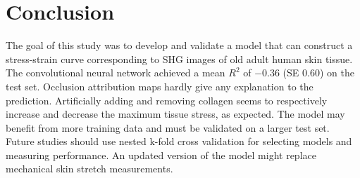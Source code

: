 \section{Conclusion}
The goal of this study was to develop and validate a model that can construct a stress-strain curve corresponding to SHG images of old adult human skin tissue.
The convolutional neural network achieved a mean $R^2$ of \num{-0.36} (SE \num{0.60}) on the test set.
Occlusion attribution maps hardly give any explanation to the prediction.
Artificially adding and removing collagen seems to respectively increase and decrease the maximum tissue stress, as expected.
The model may benefit from more training data and must be validated on a larger test set.
Future studies should use nested k-fold cross validation for selecting models and measuring performance.
An updated version of the model might replace mechanical skin stretch measurements.
